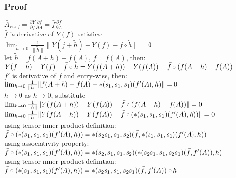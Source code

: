 \documentclass[8pt]{extarticle}
\begin{document}
\begin{multicols*}{2}
  \subsubsection{Proof}
  $\bar{A}_{\text{via }f} = \frac{\partial Y}{\partial f} \frac{\partial f}{\partial A} = \bar{f}\frac{\partial f}{\partial A}$\\

  $\bar{f}$ is derivative of $Y(f)$ satisfies:\\
  $\lim_{\tilde{h} \rightarrow 0} \frac{1}{\| \tilde{h} \|} \| Y(f+\tilde{h}) - Y(f) - \bar{f} \circ \tilde{h} \| = 0$\\

  let $\tilde{h} = f(A+h) - f(A)$, $f=f(A)$, then:\\
  $Y(f+\tilde{h}) - Y(f) - \bar{f} \circ \tilde{h}\\
  = Y(f(A+h)) - Y(f(A))\\ - \bar{f} \circ (f(A+h) - f(A))$\\

  $f'$ is derivative of $f$ and entry-wise, then:\\
  $\lim_{h\rightarrow 0} \frac{1}{\|h\|} \| f(A+h) - f(A)\\ - *(s_1, s_1, s_1)(f'(A), h) \| = 0$\\

  $\tilde{h} \rightarrow 0$ as $h\rightarrow 0$, substitute:\\
  $\lim_{h \rightarrow 0} \frac{1}{\|h\|} \|Y(f(A+h)) - Y(f(A))\\ - \bar{f} \circ (f(A+h) - f(A))\| = 0$\\
  $\lim_{h \rightarrow 0} \frac{1}{\|h\|} \|Y(f(A+h)) - Y(f(A))\\ - \bar{f} \circ (*(s_1, s_1, s_1)(f'(A), h))\| = 0$\\

  using tensor inner product definition:\\
  $\bar{f} \circ (*(s_1, s_1, s_1)(f'(A), h))\\ = *(s_2 s_1, s_1, s_2)(\bar{f}, *(s_1,s_1,s_1)(f'(A), h))$\\

  using associativity property:\\
  $\bar{f} \circ (*(s_1, s_1, s_1)(f'(A), h))\\ = *(s_2, s_1, s_1, s_2)(*(s_2 s_1, s_1, s_2 s_1)(\bar{f}, f'(A)), h)$\\

  using tensor inner product definition:\\
  $\bar{f} \circ (*(s_1, s_1, s_1)(f'(A), h))\\ = *(s_2 s_1, s_1, s_2 s_1)(\bar{f}, f'(A)) \circ h$\\


\end{multicols*}
\end{document}
